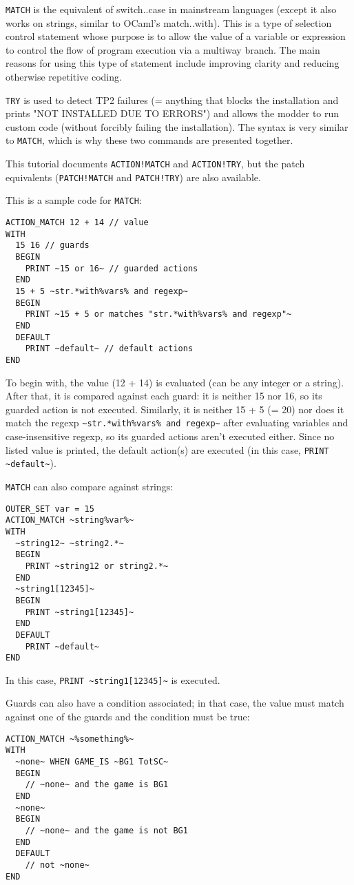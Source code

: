 \documentclass{article}
\begin{document}
\verb+MATCH+ is the equivalent of switch..case in mainstream languages (except
it also works on strings, similar to OCaml's match..with). This is a type of
selection control statement whose purpose is to allow the value of a variable
or expression to control the flow of program execution via a multiway branch.
The main reasons for using this type of statement include improving clarity
and reducing otherwise repetitive coding.

\verb+TRY+ is used to detect TP2 failures (= anything that blocks the installation
and prints "NOT INSTALLED DUE TO ERRORS") and allows the modder to run custom
code (without forcibly failing the installation). The syntax is very similar
to \verb+MATCH+, which is why these two commands are presented together.

This tutorial documents \verb+ACTION!MATCH+ and \verb+ACTION!TRY+, but the
patch equivalents (\verb+PATCH!MATCH+ and \verb+PATCH!TRY+) are also
available.

This is a sample code for \verb+MATCH+:
\begin{verbatim}
ACTION_MATCH 12 + 14 // value
WITH
  15 16 // guards
  BEGIN
    PRINT ~15 or 16~ // guarded actions
  END
  15 + 5 ~str.*with%vars% and regexp~
  BEGIN
    PRINT ~15 + 5 or matches "str.*with%vars% and regexp"~
  END
  DEFAULT
    PRINT ~default~ // default actions
END
\end{verbatim}

To begin with, the value (12 + 14) is evaluated (can be any integer or a string).
After that, it is compared against each guard: it is neither 15 nor 16, so its
guarded action is not executed.  Similarly, it is neither 15 + 5 (= 20)
nor does it match the regexp \verb+~str.*with%vars% and regexp~+ after evaluating
variables and case-insensitive regexp, so its guarded actions aren't executed either.
Since no listed value is printed, the default action(s) are executed (in this case,
\verb+PRINT ~default~+).

\verb+MATCH+ can also compare against strings:
\begin{verbatim}
OUTER_SET var = 15
ACTION_MATCH ~string%var%~
WITH
  ~string12~ ~string2.*~
  BEGIN
    PRINT ~string12 or string2.*~
  END
  ~string1[12345]~
  BEGIN
    PRINT ~string1[12345]~
  END
  DEFAULT
    PRINT ~default~
END
\end{verbatim}
In this case, \verb+PRINT ~string1[12345]~+ is executed.

Guards can also have a condition associated; in that case, the value must match
against one of the guards and the condition must be true:
\begin{verbatim}
ACTION_MATCH ~%something%~
WITH
  ~none~ WHEN GAME_IS ~BG1 TotSC~
  BEGIN
    // ~none~ and the game is BG1
  END
  ~none~
  BEGIN
    // ~none~ and the game is not BG1
  END
  DEFAULT
    // not ~none~
END
\end{verbatim}
\end{document}
